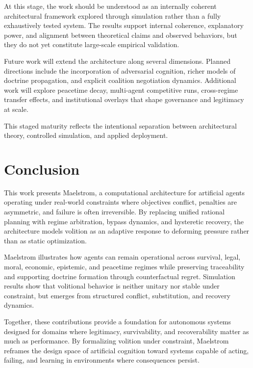 \documentclass[11pt,a4paper]{article}
\begin{document}
At this stage, the work should be understood as an internally coherent architectural framework explored through simulation rather than a fully exhaustively tested system. The results support internal coherence, explanatory power, and alignment between theoretical claims and observed behaviors, but they do not yet constitute large-scale empirical validation.

Future work will extend the architecture along several dimensions. Planned directions include the incorporation of adversarial cognition, richer models of doctrine propagation, and explicit coalition negotiation dynamics. Additional work will explore peacetime decay, multi-agent competitive runs, cross-regime transfer effects, and institutional overlays that shape governance and legitimacy at scale.

This staged maturity reflects the intentional separation between architectural theory, controlled simulation, and applied deployment.

\section{Conclusion}

This work presents Maelstrom, a computational architecture for artificial agents operating under real-world constraints where objectives conflict, penalties are asymmetric, and failure is often irreversible. By replacing unified rational planning with regime arbitration, bypass dynamics, and hysteretic recovery, the architecture models volition as an adaptive response to deforming pressure rather than as static optimization.

Maelstrom illustrates how agents can remain operational across survival, legal, moral, economic, epistemic, and peacetime regimes while preserving traceability and supporting doctrine formation through counterfactual regret. Simulation results show that volitional behavior is neither unitary nor stable under constraint, but emerges from structured conflict, substitution, and recovery dynamics.

Together, these contributions provide a foundation for autonomous systems designed for domains where legitimacy, survivability, and recoverability matter as much as performance. By formalizing volition under constraint, Maelstrom reframes the design space of artificial cognition toward systems capable of acting, failing, and learning in environments where consequences persist.

\newpage
\appendix
\end{document}
